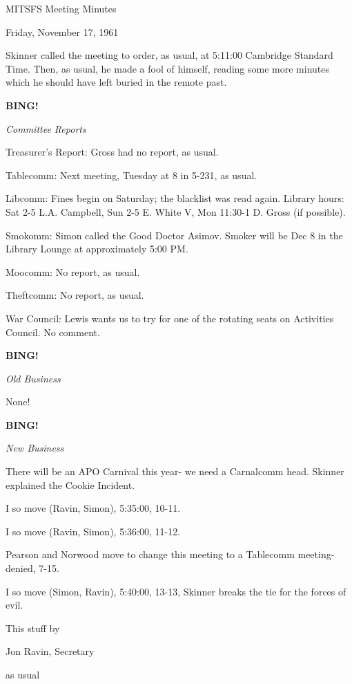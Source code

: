 \documentclass[12pt]{article}
\newcommand{\bing}{{\bf BING!} }
\newcommand{\goto}[1]{\bing \vskip 12pt \centerline{{\em{#1}}}}
\begin{document}
\begin{center}

MITSFS Meeting Minutes

Friday, November 17, 1961

\end{center}
 
\vspace{12pt}

\setlength{\parskip}{6pt}

\noindent
Skinner called the meeting to order, as usual, at 5:11:00 Cambridge Standard Time. Then, as usual, he made a fool of himself, reading some more minutes which he should have left buried in the remote past.

\goto{Committee Reports}

Treasurer's Report: Gross had no report, as usual.

Tablecomm: Next meeting, Tuesday at 8 in 5-231, as usual.

Libcomm: Fines begin on Saturday; the blacklist was read again. Library hours: Sat 2-5 L.A. Campbell, Sun 2-5 E. White V, Mon 11:30-1 D. Gross (if possible).

Smokomm: Simon called the Good Doctor Asimov. Smoker will be Dec 8 in the Library Lounge at approximately 5:00 PM.

Moocomm: No report, as usual.

Theftcomm: No report, as usual.

War Council: Lewis wants us to try for one of the rotating seats on Activities Council. No comment.

\goto{Old Business}

None!

\goto{New Business}

There will be an APO Carnival this year- we need a Carnalcomm head. Skinner explained the Cookie Incident.

I so move (Ravin, Simon), 5:35:00, 10-11.

I so move (Ravin, Simon), 5:36:00, 11-12.

Pearson and Norwood move to change this meeting to a Tablecomm meeting- denied, 7-15.

I so move (Simon, Ravin), 5:40:00, 13-13, Skinner breaks the tie for the forces of evil.

\vspace{12pt}

\centerline{This stuff by}
\centerline{Jon Ravin, Secretary}
\centerline{as usual}
\end{document}
